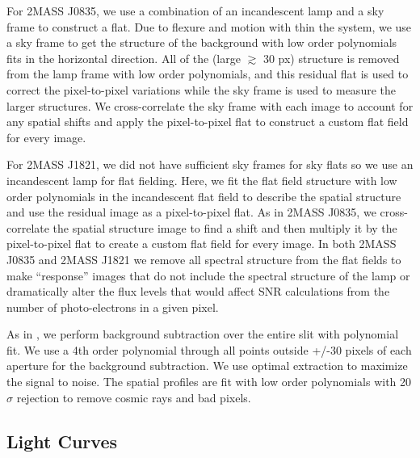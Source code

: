\documentclass[twocolumn]{aastex6}
\begin{document}
For 2MASS J0835, we use a combination of an incandescent lamp and a sky frame to construct a flat.
Due to flexure and motion with thin the system, we use a sky frame to get the structure of the background with low order polynomials fits in the horizontal direction.
All of the (large $\gtrsim$ 30 px) structure is removed from the lamp frame with low order polynomials, and this residual flat is used to correct the pixel-to-pixel variations while the sky frame is used to measure the larger structures.
We cross-correlate the sky frame with each image to account for any spatial shifts and apply the pixel-to-pixel flat to construct a custom flat field for every image.

For 2MASS J1821, we did not have sufficient sky frames for sky flats so we use an incandescent lamp for flat fielding.
Here, we fit the flat field structure with low order polynomials in the incandescent flat field to describe the spatial structure and use the residual image as a pixel-to-pixel flat.
As in 2MASS J0835, we cross-correlate the spatial structure image to find a shift and then multiply it by the pixel-to-pixel flat to create a custom flat field for every image.
In both 2MASS J0835 and 2MASS J1821 we remove all spectral structure from the flat fields to make ``response'' images that do not include the spectral structure of the lamp or dramatically alter the flux levels that would affect SNR calculations from the number of photo-electrons in a given pixel.

As in \citet{schlawin2016kic1255}, we perform background subtraction over the entire slit with polynomial fit.
We use a 4th order polynomial through all points outside +/-30 pixels of each aperture for the background subtraction.
We use optimal extraction \citep{horne1986optimalE} to maximize the signal to noise.
The spatial profiles are fit with low order polynomials with 20$\sigma$ rejection to remove cosmic rays and bad pixels.

\subsection{Light Curves}
\end{document}

